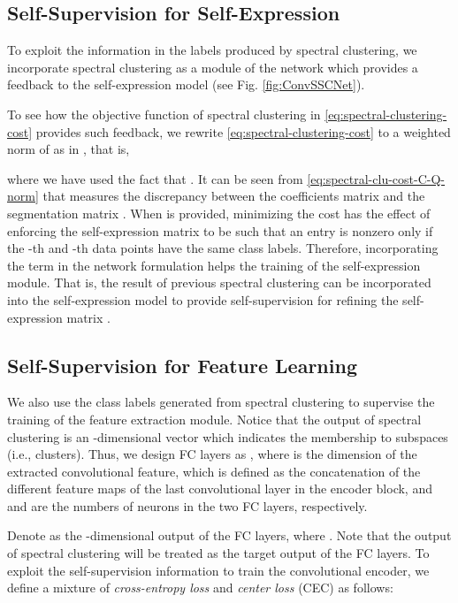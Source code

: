 \documentclass[10pt,twocolumn,letterpaper]{article}
\def\ie{i.e.}
\def\ie{i.e.}
\begin{document}
\subsection{Self-Supervision for Self-Expression}
\label{sec:weak-supervision-self-express}

To exploit the information in the labels produced by spectral clustering, we incorporate spectral clustering as a module of the network which provides a feedback to the self-expression model (see Fig. \ref{fig:ConvSSCNet}).

To see how the objective function of spectral clustering in \eqref{eq:spectral-clustering-cost} provides such feedback, we rewrite \eqref{eq:spectral-clustering-cost} to a weighted  norm of  as in \cite{Li:CVPR15}, that is,

where we have used the fact that .
It can be seen from \eqref{eq:spectral-clu-cost-C-Q-norm} that  measures the discrepancy between the coefficients matrix  and the segmentation matrix .
When  is provided, minimizing the cost  has the effect of enforcing the self-expression matrix  to be such that an entry  is nonzero only if the -th and -th data points have the same class labels.
Therefore, incorporating the term  in the network formulation helps the training of the self-expression module. That is, the result of previous spectral clustering can be incorporated into the self-expression model to provide self-supervision for refining the self-expression matrix .


\subsection{Self-Supervision for Feature Learning}
\label{sec:weak-supervision-convolutional-layer}

We also use the class labels generated from spectral clustering to supervise the training of the feature extraction module.
Notice that the output of spectral clustering is an -dimensional vector which indicates the membership to  subspaces (\ie, clusters). Thus, we design FC layers as  , where  is the dimension of the extracted convolutional feature, which is defined as the concatenation of the different feature maps of the last convolutional layer in the encoder block, and  and  are the numbers of neurons in the two FC layers, respectively. 


Denote  as the -dimensional output of the FC layers, where .
Note that the output  of spectral clustering will be treated as the target output of the FC layers.
To exploit the self-supervision information to train the convolutional encoder, we define a mixture of \textit{cross-entropy loss} and \textit{center loss} (CEC) as follows:
\end{document}
